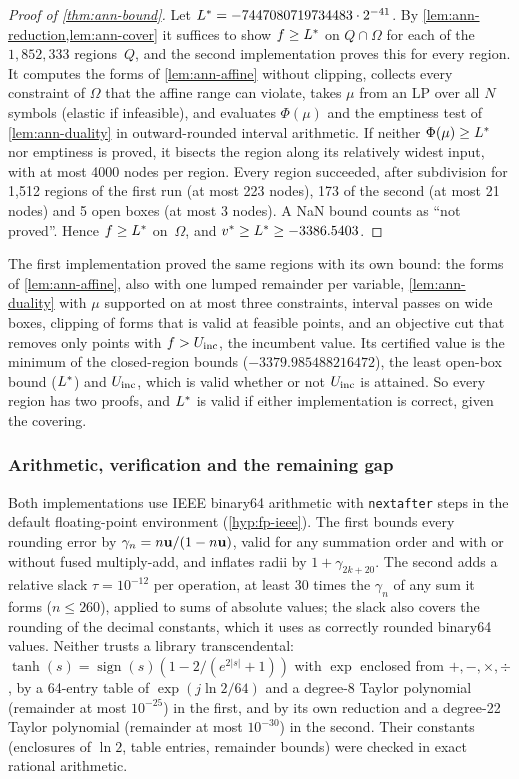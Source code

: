 \begin{proof}[Proof of \cref{thm:ann-bound}]
Let $L^*=-7447080719734483\cdot2^{-41}$.
By \cref{lem:ann-reduction,lem:ann-cover} it suffices to show $f\ge L^*$ on $Q\cap\Omega$ for each of the $1{,}852{,}333$ regions~$Q$, and the second implementation proves this for every region.
It computes the forms of \cref{lem:ann-affine} without clipping, collects every constraint of $\Omega$ that the affine range can violate, takes $\mu$ from an LP over all $N$ symbols (elastic if infeasible), and evaluates $\Phi(\mu)$ and the emptiness test of \cref{lem:ann-duality} in outward-rounded interval arithmetic.
If neither $\Phi(\mu)\ge L^*$ nor emptiness is proved, it bisects the region along its relatively widest input, with at most 4000 nodes per region.
Every region succeeded, after subdivision for 1,512 regions of the first run (at most 223 nodes), 173 of the second (at most 21 nodes) and 5 open boxes (at most 3 nodes).
A NaN bound counts as ``not proved''.
Hence $f\ge L^*$ on~$\Omega$, and $v^{*}\ge L^*\ge-3386.5403$.
\end{proof}

The first implementation proved the same regions with its own bound: the forms of \cref{lem:ann-affine}, also with one lumped remainder per variable, \cref{lem:ann-duality} with $\mu$ supported on at most three constraints, interval passes on wide boxes, clipping of forms that is valid at feasible points, and an objective cut that removes only points with $f>U_{\mathrm{inc}}$, the incumbent value.
Its certified value is the minimum of the closed-region bounds ($-3379.985488216472$), the least open-box bound ($L^*$) and $U_{\mathrm{inc}}$, which is valid whether or not $U_{\mathrm{inc}}$ is attained.
So every region has two proofs, and $L^*$ is valid if either implementation is correct, given the covering.

\subsubsection{Arithmetic, verification and the remaining gap}\label{app:annkan-ann-verif}

Both implementations use IEEE binary64 arithmetic with \texttt{nextafter} steps in the default floating-point environment (\cref{hyp:fp-ieee}).
The first bounds every rounding error by $\gamma_n=n\mathbf{u}/(1-n\mathbf{u})$, valid for any summation order and with or without fused multiply-add, and inflates radii by $1+\gamma_{2k+20}$.
The second adds a relative slack $\tau=10^{-12}$ per operation, at least 30 times the $\gamma_n$ of any sum it forms ($n\le260$), applied to sums of absolute values; the slack also covers the rounding of the decimal constants, which it uses as correctly rounded binary64 values.
Neither trusts a library transcendental: $\tanh(s)=\operatorname{sign}(s)(1-2/(e^{2|s|}+1))$ with $\exp$ enclosed from $+,-,\times,\div$, by a 64-entry table of $\exp(j\ln2/64)$ and a degree-8 Taylor polynomial (remainder at most $10^{-25}$) in the first, and by its own reduction and a degree-22 Taylor polynomial (remainder at most $10^{-30}$) in the second.
Their constants (enclosures of $\ln2$, table entries, remainder bounds) were checked in exact rational arithmetic.


